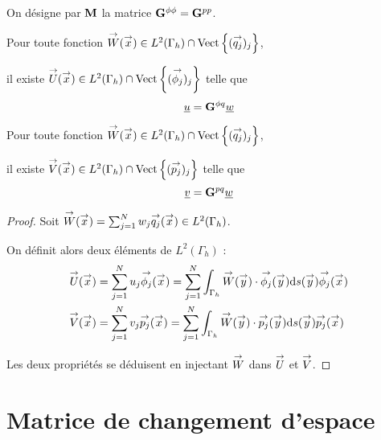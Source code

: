   \begin{defn}
    On désigne par \(\mM\) la matrice \(\mG{\phi}{\phi} = \mG{p}{p}\).
  \end{defn}

  \begin{prop}
    Pour toute fonction \(\vect{W}(\vx) \in L^2(\Gamma_h)\cap\Vect{(\qj)_j}\),

    il existe \(\vect{U}(\vx) \in L^2(\Gamma_h) \cap \Vect{(\phij)_j} \) telle que
    \begin{equation*}
      \comp{u} = \mG{\phi}{q}\comp{w}
    \end{equation*}
  \end{prop}

  \begin{prop}
    Pour toute fonction \(\vect{W}(\vx) \in L^2(\Gamma_h)\cap\Vect{(\qj)_j}\),

    il existe \(\vect{V}(\vx) \in L^2(\Gamma_h) \cap \Vect{(\pj)_j} \) telle que
    \begin{equation*}
      \comp{v} = \mG{p}{q}\comp{w}
    \end{equation*}
  \end{prop}

  \begin{proof}
    Soit  \(\vect{W}(\vx) = \sum_{j=1}^N w_j \qj(\vx) \in L^2(\Gamma_h)\).

    On définit alors deux éléments de \(L^2(\Gamma_h)\) :
    \begin{align*}
      \vect{U}(\vx) &= \sum_{j=1}^N u_j \phij(\vx) = \sum_{j=1}^N \int_{\Gamma_h}\vect{W}(\vy)\cdot\phij(\vy)\dd{s}(\vy) \phij(\vx  )
      \\
      \vect{V}(\vx) &= \sum_{j=1}^N v_j \pj(\vx) = \sum_{j=1}^N \int_{\Gamma_h}\vect{W}(\vy)\cdot\pj(\vy)\dd{s}(\vy) \pj(\vx)
    \end{align*}

    Les deux propriétés se déduisent en injectant \(\vect{W}\) dans \(\vect{U}\) et \(\vect{V}\).
  \end{proof}




\section{Matrice de changement d'espace}

